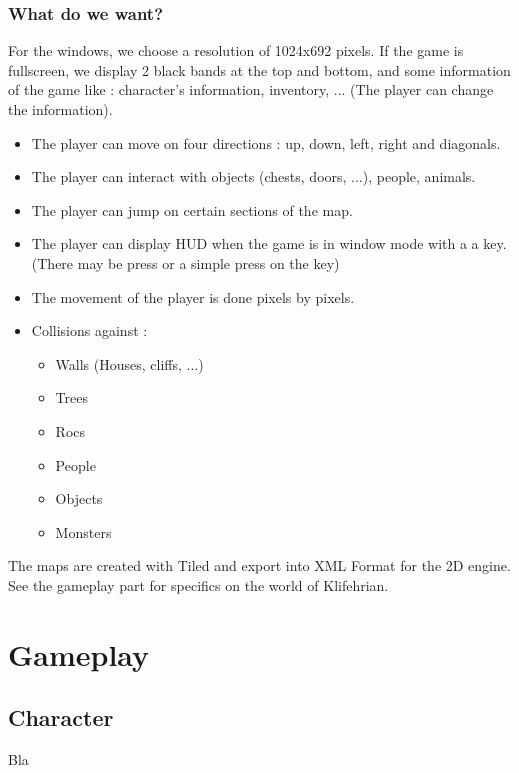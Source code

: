 \documentclass[a4paper,12pt]{book}
\begin{document}
\section*{What do we want?}
For the windows, we choose a resolution of 1024x692 pixels. If the game is fullscreen, we display 2 black bands at the top and bottom, and some information of the game like : character's information, inventory, ... (The player can change the information).
\begin{itemize}
\item The player can move on four directions : up, down, left, right and diagonals.
\item The player can interact with objects (chests, doors, ...), people, animals.
\item The player can jump on certain sections of the map.
\item The player can display HUD when the game is in window mode with a a key. (There may be press or a simple press on the key)
\item The movement of the player is done pixels by pixels.
\item Collisions against :
\begin{itemize}
\item Walls (Houses, cliffs, ...)
\item Trees
\item Rocs
\item People
\item Objects
\item Monsters
\end{itemize}
\end{itemize}
The maps are created with Tiled and export into XML Format for the 2D engine. See the gameplay part for specifics on the world of Klifehrian.
\part{Gameplay}
\chapter{Character}
Bla
\end{document}
